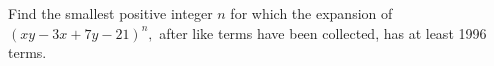 Find the smallest positive integer $n$ for which the expansion of $(xy - 3x +7y - 21)^n,$ after like terms have been collected, has at least 1996 terms.